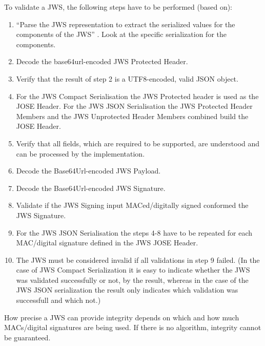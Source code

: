 To validate a JWS, the following steps have to be performed (based on\cite{rfc7515}):\newline  
\begin{enumerate} [leftmargin=1cm, rightmargin=1cm] \itemsep0.3em
\item ``Parse the JWS representation to extract the serialized values for the components of the JWS'' \cite{rfc7515}. Look at the specific serialization for the components.
\item Decode the base64url-encoded JWS Protected Header.
\item Verify that the result of step 2 is a UTF8-encoded, valid JSON object.
\item For the JWS Compact Serialisation the JWS Protected header is used as the JOSE Header. For the JWS JSON Serialisation the JWS Protected Header Members and the JWS Unprotected Header Members combined build the JOSE Header.
\item Verify that all fields, which are required to be supported, are understood and can be processed by the implementation.
\item Decode the Base64Url-encoded JWS Payload.
\item Decode the Base64Url-encoded JWS Signature.
\item Validate if the JWS Signing input MACed/digitally signed conformed the JWS Signature.
\item For the JWS JSON Serialisation the steps 4-8 have to be repeated for each MAC/digital signature defined in the JWS JOSE Header.
\item The JWS must be considered invalid if all validations in step 9 failed. (In the case of JWS Compact Serialization it is easy to indicate whether the JWS was validated successfully or not, by the result, whereas in the case of the JWS JSON serialization the result only indicates which validation was successfull and which not.)
\end{enumerate}
How precise a JWS can provide integrity depends on which and how much MACs/digital signatures are being used. If there is no algorithm, integrity cannot be guaranteed. 
